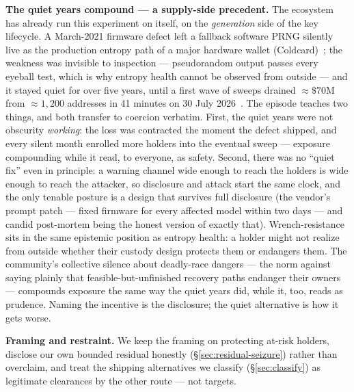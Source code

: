 \textbf{The quiet years compound --- a supply-side precedent.} The ecosystem has
already run this experiment on itself, on the \emph{generation} side of the key
lifecycle. A March-2021 firmware defect left a fallback software PRNG silently
live as the production entropy path of a major hardware wallet
(Coldcard)~\cite{block-coldcard-postmortem,coinkite-entropy}; the weakness was
invisible to inspection --- pseudorandom output passes every eyeball test, which
is why entropy health cannot be observed from outside --- and it stayed quiet
for over five years, until a first wave of sweeps drained ${\approx}\$70$M from
${\approx}1{,}200$ addresses in 41 minutes on 30 July
2026~\cite{coindesk-coldcard}. The episode teaches two
things, and both transfer to coercion verbatim. First, the quiet years were not
obscurity \emph{working}: the loss was contracted the moment the defect shipped,
and every silent month enrolled more holders into the eventual sweep ---
exposure compounding while it read, to everyone, as safety. Second, there was no
``quiet fix'' even in principle: a warning channel wide enough to reach the
holders is wide enough to reach the attacker, so disclosure and attack start the
same clock, and the only tenable posture is a design that survives full
disclosure (the vendor's prompt patch --- fixed firmware for every affected
model within two days --- and candid post-mortem being the honest version of
exactly that). Wrench-resistance sits in the same epistemic position
as entropy health: a holder might not realize from outside whether their custody
design protects them or endangers them. The community's collective silence about
deadly-race dangers --- the norm against saying plainly that
feasible-but-unfinished recovery paths endanger their owners --- compounds exposure
the same way the quiet years did, while it, too, reads as prudence. Naming the
incentive is the disclosure; the quiet alternative is how it gets worse.

\textbf{Framing and restraint.} We keep the framing on protecting at-risk holders,
disclose our own bounded residual honestly (\S\ref{sec:residual-seizure}) rather than
overclaim, and treat the shipping alternatives we classify (\S\ref{sec:classify}) as
legitimate clearances by the other route --- not targets.

